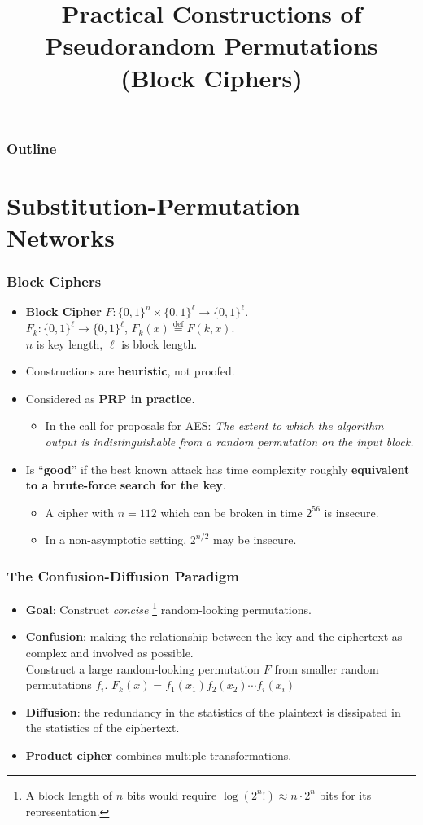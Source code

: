 

\title{Practical Constructions of Pseudorandom Permutations (Block Ciphers)}


\maketitle
\begin{frame}
\frametitle{Outline}
\tableofcontents
\end{frame}
\section{Substitution-Permutation Networks}
\begin{frame}\frametitle{Block Ciphers}
\begin{itemize}
\item \textbf{Block Cipher} $F : \{0,1\}^n \times \{0,1\}^\ell \to \{0,1\}^\ell$. \\
$F_k : \{0,1\}^\ell \to \{0,1\}^\ell$, $F_k(x) \overset{\text{def}}{=} F(k,x)$. \\
$n$ is key length, $\ell$ is block length.
\item Constructions are \textbf{heuristic}, not proofed.
\item Considered as \textbf{PRP in practice}.
\begin{itemize}
\item In the call for proposals for AES: 
\emph{The extent to which the algorithm output is indistinguishable from a random permutation on the input block.}
\end{itemize}
\item Is ``\textbf{good}'' if the best known attack has time complexity roughly \textbf{equivalent to a brute-force search for the key}.
\begin{itemize}
\item A cipher with $n=112$ which can be broken in time $2^{56}$ is insecure.
\item In a non-asymptotic setting, $2^{n/2}$ may be insecure.
\end{itemize}
\end{itemize}
\end{frame}
\begin{frame}\frametitle{The Confusion-Diffusion Paradigm}
	\begin{itemize}
	\item \textbf{Goal}: Construct \emph{concise} \footnote{A block length of $n$ bits would require $\log(2^n!) \approx n\cdot 2^n $ bits for its representation.} random-looking permutations.
	\item \textbf{Confusion}: making the relationship between the key and the ciphertext as complex and involved as possible. \\
	Construct a large random-looking permutation $F$ from smaller random permutations ${f_i}$. $F_k(x) = f_1(x_1)f_2(x_2) \cdots f_{i}(x_{i})$
	\item \textbf{Diffusion}: the redundancy in the statistics of the plaintext is dissipated in the statistics of the ciphertext.
	\item \textbf{Product cipher} combines multiple transformations.
	\end{itemize}
\end{frame}
